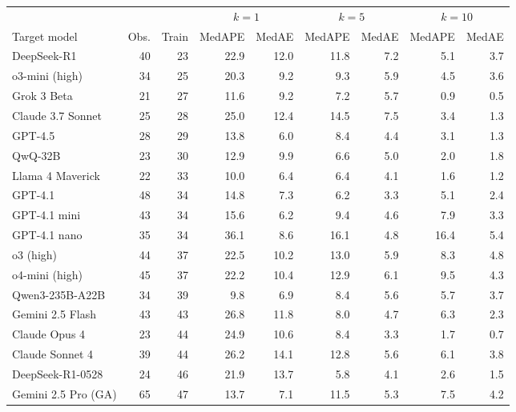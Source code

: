\begin{tabular}{@{}l r r rr rr rr@{}}
\toprule
& & & \multicolumn{2}{c}{$k = 1$} & \multicolumn{2}{c}{$k = 5$} & \multicolumn{2}{c}{$k = 10$} \\
\cmidrule(lr){4-5} \cmidrule(lr){6-7} \cmidrule(lr){8-9}
Target model & Obs. & Train & MedAPE & MedAE & MedAPE & MedAE & MedAPE & MedAE \\
\midrule
DeepSeek-R1                    & 40 & 23 & 22.9 & 12.0 & 11.8 & 7.2 & 5.1 & 3.7 \\
o3-mini (high)                 & 34 & 25 & 20.3 & 9.2 & 9.3 & 5.9 & 4.5 & 3.6 \\
Grok 3 Beta                    & 21 & 27 & 11.6 & 9.2 & 7.2 & 5.7 & 0.9 & 0.5 \\
Claude 3.7 Sonnet              & 25 & 28 & 25.0 & 12.4 & 14.5 & 7.5 & 3.4 & 1.3 \\
GPT-4.5                        & 28 & 29 & 13.8 & 6.0 & 8.4 & 4.4 & 3.1 & 1.3 \\
QwQ-32B                        & 23 & 30 & 12.9 & 9.9 & 6.6 & 5.0 & 2.0 & 1.8 \\
Llama 4 Maverick               & 22 & 33 & 10.0 & 6.4 & 6.4 & 4.1 & 1.6 & 1.2 \\
GPT-4.1                        & 48 & 34 & 14.8 & 7.3 & 6.2 & 3.3 & 5.1 & 2.4 \\
GPT-4.1 mini                   & 43 & 34 & 15.6 & 6.2 & 9.4 & 4.6 & 7.9 & 3.3 \\
GPT-4.1 nano                   & 35 & 34 & 36.1 & 8.6 & 16.1 & 4.8 & 16.4 & 5.4 \\
o3 (high)                      & 44 & 37 & 22.5 & 10.2 & 13.0 & 5.9 & 8.3 & 4.8 \\
o4-mini (high)                 & 45 & 37 & 22.2 & 10.4 & 12.9 & 6.1 & 9.5 & 4.3 \\
Qwen3-235B-A22B                & 34 & 39 & 9.8 & 6.9 & 8.4 & 5.6 & 5.7 & 3.7 \\
Gemini 2.5 Flash               & 43 & 43 & 26.8 & 11.8 & 8.0 & 4.7 & 6.3 & 2.3 \\
Claude Opus 4                  & 23 & 44 & 24.9 & 10.6 & 8.4 & 3.3 & 1.7 & 0.7 \\
Claude Sonnet 4                & 39 & 44 & 26.2 & 14.1 & 12.8 & 5.6 & 6.1 & 3.8 \\
DeepSeek-R1-0528               & 24 & 46 & 21.9 & 13.7 & 5.8 & 4.1 & 2.6 & 1.5 \\
Gemini 2.5 Pro (GA)            & 65 & 47 & 13.7 & 7.1 & 11.5 & 5.3 & 7.5 & 4.2 \\

\end{tabular}
